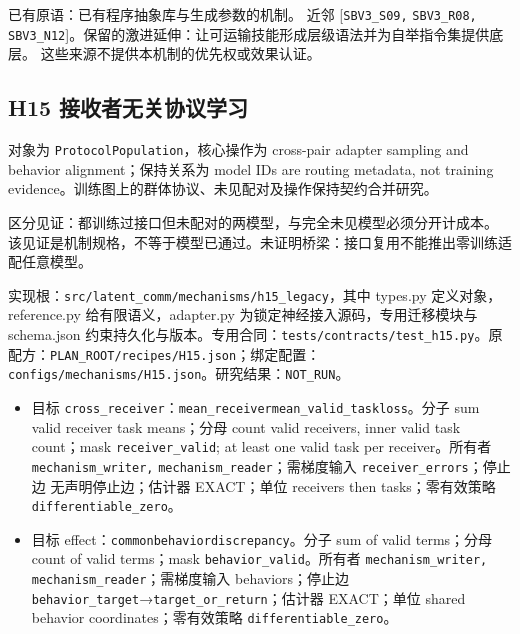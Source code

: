 \documentclass[
  10pt,
]{article}
\begin{document}
已有原语：已有程序抽象库与生成参数的机制。 近邻 {[}\nolinkurl{SBV3_S09,}
\nolinkurl{SBV3_R08,}
\nolinkurl{SBV3_N12}{]}。保留的激进延伸：让可运输技能形成层级语法并为自举指令集提供底层。
这些来源不提供本机制的优先权或效果认证。

\subsection{H15
接收者无关协议学习}\label{h15-ux63a5ux6536ux8005ux65e0ux5173ux534fux8baeux5b66ux4e60}

对象为 \nolinkurl{ProtocolPopulation}，核心操作为 cross-pair adapter
sampling and behavior alignment；保持关系为 model IDs are routing
metadata, not training
evidence。训练图上的群体协议、未见配对及操作保持契约合并研究。

区分见证：都训练过接口但未配对的两模型，与完全未见模型必须分开计成本。
该见证是机制规格，不等于模型已通过。未证明桥梁：接口复用不能推出零训练适配任意模型。

实现根：{\small\nolinkurl{src/latent_comm/mechanisms/h15_legacy}}，其中
types.py 定义对象，reference.py 给有限语义，adapter.py
为锁定神经接入源码，专用迁移模块与 schema.json
约束持久化与版本。专用合同：{\small\nolinkurl{tests/contracts/test_h15.py}}。原配方：{\small\nolinkurl{PLAN_ROOT/recipes/H15.json}}；绑定配置：{\small\nolinkurl{configs/mechanisms/H15.json}}。研究结果：\nolinkurl{NOT_RUN}。

\begin{itemize}
\item
  目标
  \nolinkurl{cross_receiver}：{\small\nolinkurl{mean_receiver}\hspace{0.333em}\nolinkurl{mean_valid_task}\hspace{0.333em}\nolinkurl{loss}}。分子
  sum valid receiver task means；分母 count valid receivers, inner valid
  task count；mask \nolinkurl{receiver_valid}; at least one valid task
  per receiver。所有者 \nolinkurl{mechanism_writer,}
  \nolinkurl{mechanism_reader}；需梯度输入
  \nolinkurl{receiver_errors}；停止边 无声明停止边；估计器 EXACT；单位
  receivers then tasks；零有效策略 \nolinkurl{differentiable_zero}。
\item
  目标
  effect：{\small\nolinkurl{common}\hspace{0.333em}\nolinkurl{behavior}\hspace{0.333em}\nolinkurl{discrepancy}}。分子
  sum of valid terms；分母 count of valid terms；mask
  \nolinkurl{behavior_valid}。所有者 \nolinkurl{mechanism_writer,}
  \nolinkurl{mechanism_reader}；需梯度输入 behaviors；停止边
  \nolinkurl{behavior_target}→\nolinkurl{target_or_return}；估计器
  EXACT；单位 shared behavior coordinates；零有效策略
  \nolinkurl{differentiable_zero}。
\end{itemize}
\end{document}
